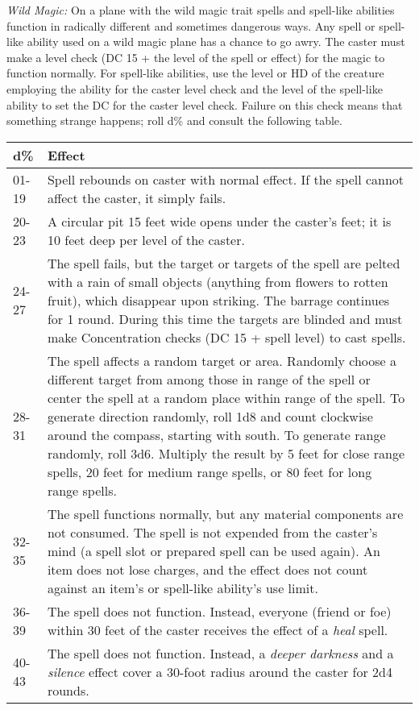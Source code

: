 \documentclass{article}
\begin{document}
\textit{Wild Magic:} On a plane with the wild magic trait spells and spell-like 
abilities function in radically different and sometimes dangerous ways. Any spell 
or spell-like ability used on a wild magic plane has a chance to go awry. The caster 
must make a level check (DC 15 + the level of the spell or effect) for the magic 
to function normally. For spell-like abilities, use the level or HD of the creature 
employing the ability for the caster level check and the level of the spell-like 
ability to set the DC for the caster level check. Failure on this check means that 
something strange happens; roll d\% and consult the following table.

\vspace{12pt}
\begin{tabular}{|>{\raggedright}p{24pt}|>{\raggedright}p{302pt}|}
\hline
d\textbf{\%} & E\textbf{ffect}\tabularnewline
\hline
01-19 & Spell rebounds on caster with normal effect. If the spell cannot affect 
the caster, it simply fails.\tabularnewline
\hline
20-23 & A circular pit 15 feet wide opens under the caster's feet; it is 10 feet 
deep per level of the caster.\tabularnewline
\hline
24-27 & The spell fails, but the target or targets of the spell are pelted with 
a rain of small objects (anything from flowers to rotten fruit), which disappear 
upon striking. The barrage continues for 1 round. During this time the targets 
are blinded and must make Concentration checks (DC 15 + spell level) to cast spells.\tabularnewline
\hline
28-31 & The spell affects a random target or area. Randomly choose a different 
target from among those in range of the spell or center the spell at a random place 
within range of the spell. To generate direction randomly, roll 1d8 and count clockwise 
around the compass, starting with south. To generate range randomly, roll 3d6. 
Multiply the result by 5 feet for close range spells, 20 feet for medium range 
spells, or 80 feet for long range spells.\tabularnewline
\hline
32-35 & The spell functions normally, but any material components are not consumed. 
The spell is not expended from the caster's mind (a spell slot or prepared spell 
can be used again). An item does not lose charges, and the effect does not count 
against an item's or spell-like ability's use limit. \tabularnewline
\hline
36-39 & The spell does not function. Instead, everyone (friend or foe) within 30 
feet of the caster receives the effect of a \textit{heal }spell.\tabularnewline
\hline
40-43 & The spell does not function. Instead, a \textit{deeper darkness }and a 
\textit{silence }effect cover a 30-foot radius around the caster for 2d4 rounds.\tabularnewline

\end{tabular}
\end{document}
